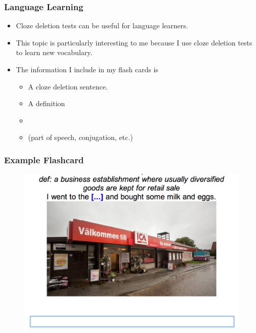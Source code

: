 \documentclass{beamer}
\begin{document}
\begin{frame}
\frametitle{Language Learning}
\begin{itemize}
    \item Cloze deletion tests can be useful for language learners.
    \item This topic is particularly interesting to me because I use cloze deletion tests to learn new vocabulary.
    \item The information I include in my flash cards is
        \begin{itemize}
            \item A cloze deletion sentence.
            \item A definition
            \item {}
            \item {} (part of speech, conjugation, etc.)
        \end{itemize}
\end{itemize}
\end{frame}

\begin{frame}
    \frametitle{Example Flashcard}
\begin{figure}
\includegraphics[scale=0.4]{cloze_example.png}
\end{figure}
\end{frame}
\end{document}
